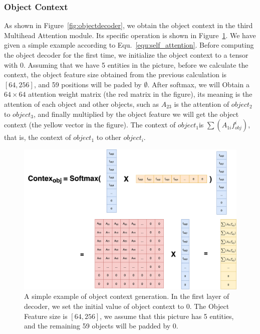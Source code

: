\subsubsection{Object Context}

As shown in Figure~\ref{fig:objectdecoder}, we obtain the object context in the third Multihead Attention module. Its specific operation is shown in Figure~\ref{fig:objcontext}. We have given a simple example according to Equ.~\ref{equ:self_attention}. Before computing the object decoder for the first time, we initialize the object context to a tensor with 0. Assuming that we have 5 entities in the picture, before we calculate the context, the object feature size obtained from the previous calculation is $ [64, 256] $, and 59 positions will be paded by $\emptyset$. After softmax, we will Obtain a $ 64 \times 64  $ attention weight matrix (the red matrix in the figure), its meaning is the attention of each object and other objects, such as $ A_{23}$ is the attention of $ object_2 $ to $ object_3 $, and finally multiplied by the object feature we will get the object context (the yellow vector in the figure). The context of $ object_1  $is $ \sum(A_{1i}f_{obj}^i) $, that is, the context of $ object_1 $ to other $ object_i $.

\begin{figure}[tbph!]
	\centering
	\includegraphics[width=1\linewidth]{figures/obj_context}
	\caption[A simple example of the  Object Context generation.]{A simple example of object context generation. In the first layer of decoder, we set the initial value of object context to 0. The Object Feature size is $ [64, 256] $, we assume that this picture has 5 entities, and the remaining 59 objects will be padded by 0.}
	\label{fig:objcontext}
\end{figure}


